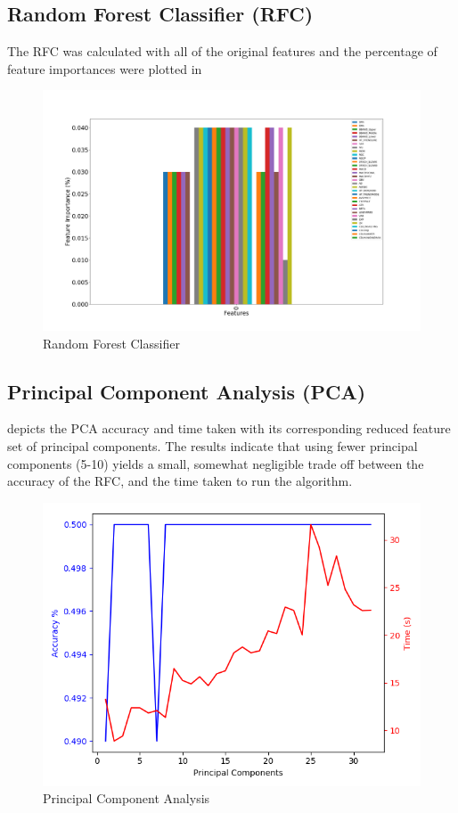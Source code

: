 \documentclass{article}\raggedbottom
\begin{document}
\subsection{Random Forest Classifier (RFC)}

The RFC was calculated with all of the original features and the percentage of feature importances were plotted in 

\begin{figure}[H]
	\centering
	\includegraphics[width=\linewidth]{data/RFC_importancesT1.png}
	\caption{Random Forest Classifier}
	\label{fig:RFC}
\end{figure}

\subsection{Principal Component Analysis (PCA)}
 depicts the PCA accuracy and time taken with its corresponding reduced feature set of principal components. The results indicate that using fewer principal components (5-10) yields a small, somewhat negligible trade off between the accuracy of the RFC, and the time taken to run the algorithm. 

\begin{figure}[H]
	\centering
	\includegraphics[width=\linewidth]{data/PCAT1.png}
	\caption{Principal Component Analysis}
	\label{fig:PCA}
\end{figure}
\end{document}
